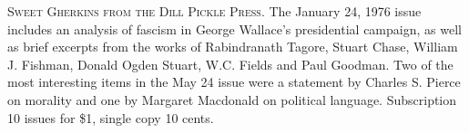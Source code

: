 \noindent\textsc{Sweet Gherkins from the Dill Pickle Press.} The January 24, 1976 issue includes an analysis of fascism in George Wallace's presidential campaign, as well as brief excerpts from the works of Rabindranath Tagore, Stuart Chase, William J. Fishman, Donald Ogden Stuart, W.C. Fields and Paul Goodman. Two of the most interesting items in the May 24 issue were a statement by Charles S. Pierce on morality and one by Margaret Macdonald on political language. Subscription 10 issues for \$1, single copy 10 cents. 
